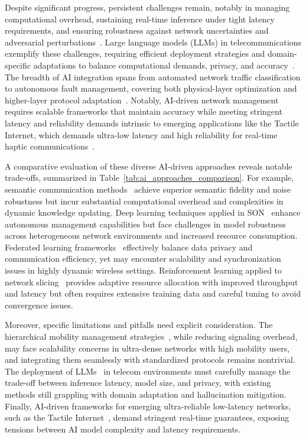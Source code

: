 \documentclass[sigconf]{acmart}
\begin{document}
Despite significant progress, persistent challenges remain, notably in managing computational overhead, sustaining real-time inference under tight latency requirements, and ensuring robustness against network uncertainties and adversarial perturbations~\cite{ref7,ref8,ref9}. Large language models (LLMs) in telecommunications exemplify these challenges, requiring efficient deployment strategies and domain-specific adaptations to balance computational demands, privacy, and accuracy~\cite{ref7}. The breadth of AI integration spans from automated network traffic classification to autonomous fault management, covering both physical-layer optimization and higher-layer protocol adaptation~\cite{ref10,ref49,ref50}. Notably, AI-driven network management requires scalable frameworks that maintain accuracy while meeting stringent latency and reliability demands intrinsic to emerging applications like the Tactile Internet, which demands ultra-low latency and high reliability for real-time haptic communications~\cite{ref10}. 

A comparative evaluation of these diverse AI-driven approaches reveals notable trade-offs, summarized in Table~\ref{tab:ai_approaches_comparison}. For example, semantic communication methods~\cite{ref1} achieve superior semantic fidelity and noise robustness but incur substantial computational overhead and complexities in dynamic knowledge updating. Deep learning techniques applied in SON~\cite{ref2} enhance autonomous management capabilities but face challenges in model robustness across heterogeneous network environments and increased resource consumption. Federated learning frameworks~\cite{ref4,ref5} effectively balance data privacy and communication efficiency, yet may encounter scalability and synchronization issues in highly dynamic wireless settings. Reinforcement learning applied to network slicing~\cite{ref6} provides adaptive resource allocation with improved throughput and latency but often requires extensive training data and careful tuning to avoid convergence issues.

Moreover, specific limitations and pitfalls need explicit consideration. The hierarchical mobility management strategies~\cite{ref19}, while reducing signaling overhead, may face scalability concerns in ultra-dense networks with high mobility users, and integrating them seamlessly with standardized protocols remains nontrivial. The deployment of LLMs~\cite{ref7} in telecom environments must carefully manage the trade-off between inference latency, model size, and privacy, with existing methods still grappling with domain adaptation and hallucination mitigation. Finally, AI-driven frameworks for emerging ultra-reliable low-latency networks, such as the Tactile Internet~\cite{ref10}, demand stringent real-time guarantees, exposing tensions between AI model complexity and latency requirements.
\end{document}
